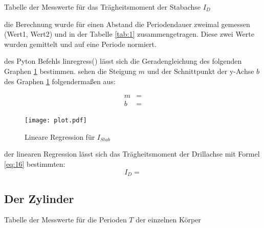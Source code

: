\begin{table}[H]
    \centering
    
    \caption{Tabelle der Messwerte für das Trägheitsmoment der Stabachse $I_D$}
    \label{tab:1}
\end{table}

 die Berechnung wurde für einen Abstand die Periodendauer zweimal gemessen (Wert1, Wert2) und in der Tabelle \ref{tab:1}
zusammengetragen. Diese zwei Werte wurden gemittelt und auf eine Periode normiert.

\justifying des Pyton Befehls linregress() \cite{numpy} lässt sich die Geradengleichung
des folgenden Graphen \ref{fig:1} bestimmen. 
\justifying sehen die Steigung $m$ und der Schnittpunkt der y-Achse $b$ des Graphen \ref{fig:1} folgendermaßen aus:

\begin{subequations}
\begin{align}
m &= \text{}\label{eq:17a}\\
b &= \text{}\label{eq:17b}
\end{align}
\end{subequations}

\begin{figure}[H]
    \centering
    \texttt{[image: plot.pdf]}
    \caption{Lineare Regression für $I_{Stab}$}
    \label{fig:1}
\end{figure}

\justifying der linearen Regression lässt sich das Trägheitsmoment der Drillachse mit Formel \eqref{eq:16} bestimmten:
\begin{equation}
I_D = \label{eq:18} %
\end{equation}

\subsection{Der Zylinder}\justifying %
\label{sec:5.5}
\begin{table}[H]
    \centering
    
    \caption{Tabelle der Messwerte für die Perioden $T$ der einzelnen Körper}
    \label{tab:3}
\end{table}

